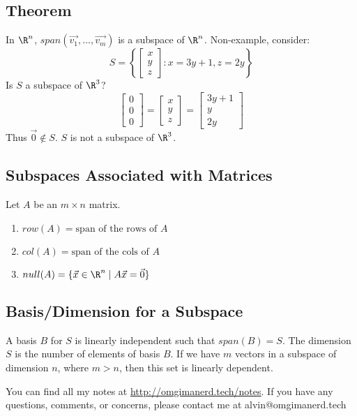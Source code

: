 \documentclass[letterpaper, 12pt]{math}
\begin{document}
\subsection*{Theorem}
In \( \R^n \), \( span(\vec{v_1},\dots,\vec{v_m}) \) is a subspace of
\( \R^n \). Non-example, consider:
\[ S = \left\{\begin{bmatrix}x \\ y \\ z\end{bmatrix}: x = 3y+1, z = 2y
  \right\} \]
Is \( S \) a subspace of \( \R^3 \)?
\[ \begin{bmatrix}0 \\ 0 \\ 0\end{bmatrix} =
  \begin{bmatrix}x \\ y \\ z\end{bmatrix} =
  \begin{bmatrix}3y+1 \\ y \\ 2y\end{bmatrix} \]
Thus \( \vec{0}\notin S \). \( S \) is not a subspace of \( \R^3 \).

\subsection*{Subspaces Associated with Matrices}
Let \( A \) be an \( m\times n \) matrix.
\begin{enumerate}
  \item \( row(A) = \text{span of the rows of } A \)
  \item \( col(A) = \text{span of the cols of } A \)
  \item \( null(A) = \{\vec{x}\in\R^n\mid A\vec{x} = \vec{0}\} \)
\end{enumerate}

\subsection*{Basis/Dimension for a Subspace}
A basis \( B \) for \( S \) is linearly independent such that \( span(B) = S \).
The dimension \( S \) is the number of elements of basis \( B \). If we have
\( m \) vectors in a subspace of dimension \( n \), where \( m > n \), then
this set is linearly dependent.

\begin{center}
  You can find all my notes at \url{http://omgimanerd.tech/notes}. If you have
  any questions, comments, or concerns, please contact me at
  alvin@omgimanerd.tech
\end{center}
\end{document}

